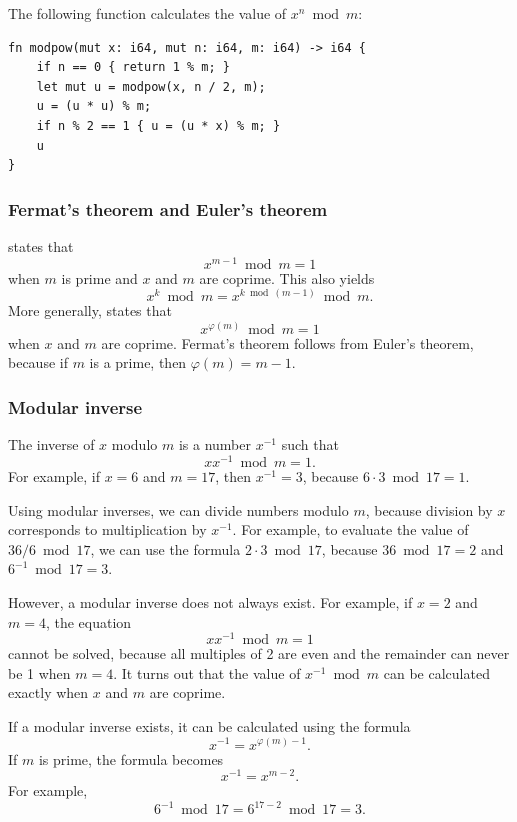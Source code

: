 The following function calculates the value of
$x^n \bmod m$:

\begin{lstlisting}
fn modpow(mut x: i64, mut n: i64, m: i64) -> i64 {
    if n == 0 { return 1 % m; }
    let mut u = modpow(x, n / 2, m);
    u = (u * u) % m;
    if n % 2 == 1 { u = (u * x) % m; }
    u
}
\end{lstlisting}

\subsubsection{Fermat's theorem and Euler's theorem}


states that
\[x^{m-1} \bmod m = 1\]
when $m$ is prime and $x$ and $m$ are coprime.
This also yields
\[x^k \bmod m = x^{k \bmod (m-1)} \bmod m.\]
More generally, 
states that
\[x^{\varphi(m)} \bmod m = 1\]
when $x$ and $m$ are coprime.
Fermat's theorem follows from Euler's theorem,
because if $m$ is a prime, then $\varphi(m)=m-1$.

\subsubsection{Modular inverse}


The inverse of $x$ modulo $m$
is a number $x^{-1}$ such that
\[ x x^{-1} \bmod m = 1. \]
For example, if $x=6$ and $m=17$,
then $x^{-1}=3$, because $6\cdot3 \bmod 17=1$.

Using modular inverses, we can divide numbers
modulo $m$, because division by $x$
corresponds to multiplication by $x^{-1}$.
For example, to evaluate the value of $36/6 \bmod 17$,
we can use the formula $2 \cdot 3 \bmod 17$,
because $36 \bmod 17 = 2$ and $6^{-1} \bmod 17 = 3$.

However, a modular inverse does not always exist.
For example, if $x=2$ and $m=4$, the equation
\[ x x^{-1} \bmod m = 1 \]
cannot be solved, because all multiples of 2
are even and the remainder can never be 1 when $m=4$.
It turns out that the value of $x^{-1} \bmod m$
can be calculated exactly when $x$ and $m$ are coprime.

If a modular inverse exists, it can be
calculated using the formula
\[
x^{-1} = x^{\varphi(m)-1}.
\]
If $m$ is prime, the formula becomes
\[
x^{-1} = x^{m-2}.
\]
For example,
\[6^{-1} \bmod 17 =6^{17-2} \bmod 17 = 3.\]

